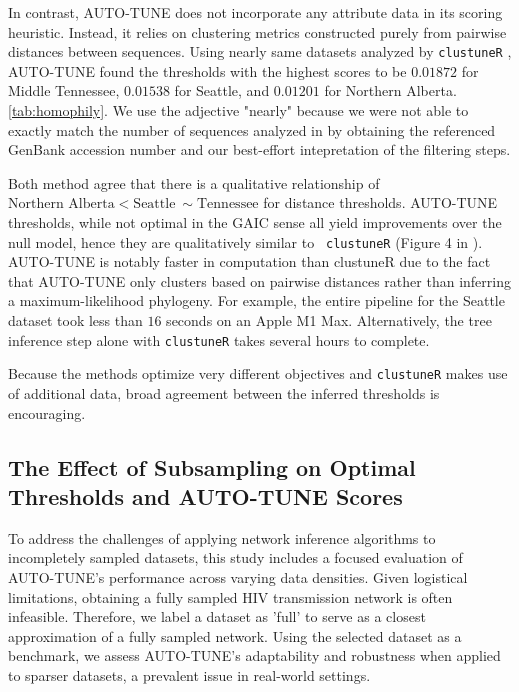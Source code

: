 \documentclass[utf8]{FrontiersinHarvard} %
\newcommand{\TODO}[1]{{\color{red}{#1}}}
\begin{document}
In contrast, AUTO-TUNE does not incorporate any attribute data in its scoring
heuristic. Instead, it relies on clustering metrics constructed purely from
pairwise distances between sequences. Using nearly same datasets analyzed by
	{\tt clustuneR} \citep{chato_public_2020}, AUTO-TUNE found the thresholds with
the highest scores to be $0.01872$ for Middle Tennessee, $0.01538$ for Seattle,
and $0.01201$ for Northern Alberta. \autoref{tab:homophily}. We use the
adjective "nearly" because we were not able to exactly match the number of
sequences analyzed in \citet{chato_public_2020} by obtaining the referenced
GenBank accession number and our best-effort intepretation of the filtering
steps.

Both method agree that there is a qualitative relationship of $\text{Northern
		Alberta} < \text{Seattle} ~\sim \text{Tennessee}$ for distance thresholds.
AUTO-TUNE thresholds, while not optimal in the GAIC sense all yield
improvements over the null model, hence they are qualitatively similar to {\tt
		clustuneR} (Figure 4 in \cite{chato_public_2020}). AUTO-TUNE is notably faster
in computation than clustuneR due to the fact that AUTO-TUNE only clusters
based on pairwise distances rather than inferring a maximum-likelihood
phylogeny. For example, the entire pipeline for the Seattle dataset took less
than $16$ seconds on an Apple M1 Max. Alternatively, the tree inference step
alone with {\tt clustuneR} takes several hours to complete.

Because the methods optimize very different objectives and {\tt clustuneR}
makes use of additional data, broad agreement between the inferred thresholds
is encouraging.

\subsection{The Effect of Subsampling on Optimal Thresholds and AUTO-TUNE Scores}
\TODO{STEVEN, PLEASE UPDATE}

To address the challenges of applying network inference algorithms to
incompletely sampled datasets, this study includes a focused evaluation of
AUTO-TUNE's performance across varying data densities. Given logistical
limitations, obtaining a fully sampled HIV transmission network is often
infeasible. Therefore, we label a dataset as 'full' to serve as a closest
approximation of a fully sampled network. Using the selected dataset as a
benchmark, we assess AUTO-TUNE's adaptability and robustness when applied to
sparser datasets, a prevalent issue in real-world settings.
\end{document}
